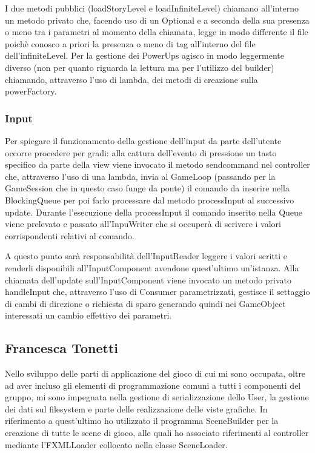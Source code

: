 \documentclass[a4paper,12pt]{report}
\begin{document}
I due metodi pubblici (loadStoryLevel e loadInfiniteLevel) chiamano all'interno un metodo privato che, facendo uso di un Optional e a seconda della sua presenza o meno tra i parametri al momento della chiamata, legge in modo differente il file poichè conosco a priori la presenza o meno di tag all'interno del file dell'infiniteLevel.
Per la gestione dei PowerUps agisco in modo leggermente diverso (non per quanto riguarda la lettura ma per l'utilizzo del builder) chiamando, attraverso l'uso di lambda, dei metodi di creazione sulla powerFactory.

\subsubsection*{Input}
Per spiegare il funzionamento della gestione dell'input da parte dell'utente occorre procedere per gradi: alla cattura dell'evento di pressione un tasto specifico da parte della view viene invocato il metodo sendcommand nel controller che, attraverso l'uso di una lambda, invia al GameLoop (passando per la GameSession che in questo caso funge da ponte) il comando da inserire nella BlockingQueue per poi farlo processare dal metodo processInput al successivo update.
Durante l'esecuzione della processInput il comando inserito nella Queue viene prelevato e passato all'InpuWriter che si occuperà di scrivere i valori corrispondenti relativi al comando.

A questo punto sarà responsabilità dell'InputReader leggere i valori scritti e renderli disponibili all'InputComponent avendone quest'ultimo un'istanza.
Alla chiamata dell'update sull'InputComponent viene invocato un metodo privato handleInput che, attraverso l'uso di Consumer parametrizzati, gestisce il settaggio di cambi di direzione o richiesta di sparo generando quindi nei GameObject interessati un cambio effettivo dei parametri.


\subsection*{Francesca Tonetti}
Nello sviluppo delle parti di applicazione del gioco di cui mi sono occupata, oltre ad aver incluso gli elementi di programmazione comuni a tutti i componenti del gruppo, mi sono impegnata nella gestione di serializzazione dello User, la gestione dei dati sul filesystem e parte delle realizzazione delle viste grafiche.
In riferimento a quest'ultimo ho utilizzato il programma SceneBuilder per la creazione di tutte le scene di gioco, alle quali ho associato riferimenti al controller mediante l'FXMLLoader collocato nella classe SceneLoader.
\end{document}
